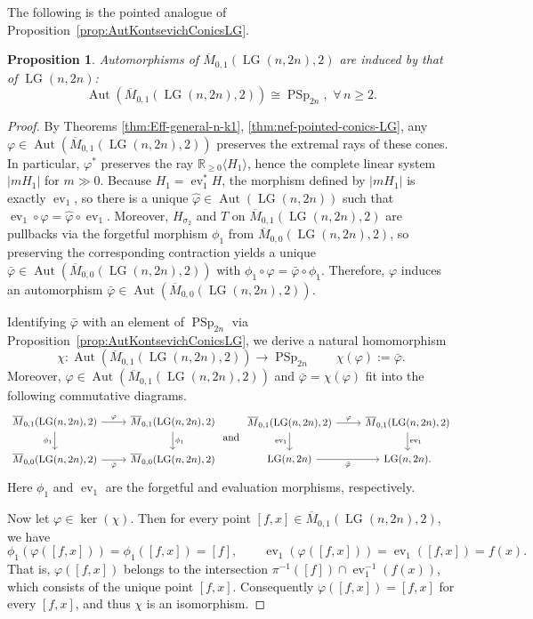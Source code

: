 \documentclass[10pt]{amsart}
\newtheorem{proposition}[theorem]{Proposition}
\theoremstyle{definition}
\newcommand{\Aut}{\operatorname{Aut}}
\newcommand{\LG}{\operatorname{LG}}
\DeclareMathOperator{\PSp}{PSp}
\newcommand{\ev}{\operatorname{ev}}
\theoremstyle{plain} %
\begin{document}
The following is the pointed analogue of Proposition~\ref{prop:AutKontsevichConicsLG}.

\begin{proposition}\label{prop:AutKontsevichConicsLGpointed}
Automorphisms of $\overline{M}_{0,1}(\LG(n,2n),2)$ are induced by that of $\LG(n,2n)$:
\[
\Aut(\overline{M}_{0,1}(\LG(n,2n),2))\cong\PSp_{2n},\,\,\forall\,n\geq 2.
\]
\end{proposition}

\begin{proof}
By Theorems \ref{thm:Eff-general-n-k1}, \ref{thm:nef-pointed-conics-LG}, any
$\varphi\in\Aut(\overline{M}_{0,1}(\LG(n,2n),2))$ preserves the extremal rays of these cones. In particular, $\varphi^{*}$ preserves the ray
$\mathbb{R}_{\ge 0}\langle H_1\rangle$, hence the complete linear system $|mH_1|$ for $m\gg 0$.
Because $H_1=\ev_1^{*}H$, the morphism defined by $|mH_1|$ is exactly $\ev_1$, so there is a unique
$\widehat\varphi\in \Aut(\LG(n,2n))$ such that $\ev_1\circ \varphi=\widehat\varphi\circ \ev_1$.
Moreover, $H_{\sigma_2}$ and $T$ on $\overline{M}_{0,1}(\LG(n,2n),2)$ are pullbacks via the forgetful morphism
$\phi_1$ from $\overline{M}_{0,0}(\LG(n,2n),2)$, so preserving the corresponding contraction yields a unique
$\bar\varphi\in \Aut(\overline{M}_{0,0}(\LG(n,2n),2))$ with $\phi_1\circ \varphi=\bar\varphi\circ \phi_1$.  Therefore, $\varphi$ induces an automorphism $\bar\varphi\in\Aut(\overline{M}_{0,0}(\LG(n,2n),2))$.


Identifying $\bar\varphi$ with an element of $\PSp_{2n}$ via Proposition~\ref{prop:AutKontsevichConicsLG}, we derive a natural homomorphism
\[
\chi\colon\Aut(\overline{M}_{0,1}(\LG(n,2n),2))\rightarrow \PSp_{2n}
\qquad
\chi(\varphi):=\bar\varphi.
\]
Moreover, 
$\varphi\in\Aut(\overline{M}_{0,1}(\LG(n,2n),2))$ and  $\bar\varphi=\chi(\varphi)$ fit into the following commutative diagrams.
\[
\begin{tikzcd}
\overline{M}_{0,1}(\LG(n,2n),2) \arrow[r,"\varphi"] \arrow[d,"\phi_1"'] &
\overline{M}_{0,1}(\LG(n,2n),2) \arrow[d,"\phi_1"] \\
\overline{M}_{0,0}(\LG(n,2n),2) \arrow[r,"\bar\varphi"'] &
\overline{M}_{0,0}(\LG(n,2n),2)
\end{tikzcd}
\,\, {\rm and}\,\,
\begin{tikzcd}
\overline{M}_{0,1}(\LG(n,2n),2) \arrow[r,"\varphi"] \arrow[d,"\ev_1"'] &
\overline{M}_{0,1}(\LG(n,2n),2) \arrow[d,"\ev_1"] \\
\LG(n,2n) \arrow[r,"\bar\varphi"'] &
\LG(n,2n).
\end{tikzcd}
\]
Here $\phi_1$ and $\ev_1$ are the forgetful and evaluation morphisms, respectively.


Now let $\varphi\in\ker(\chi)$. Then for every point $[f,x]\in \overline{M}_{0,1}(\LG(n,2n),2)$, we have
\[
\phi_1(\varphi([f,x]))=\phi_1([f,x])=[f],
\qquad
\ev_1(\varphi([f,x]))=\ev_1([f,x])=f(x).
\]
That is,  $\varphi([f,x])$ belongs to the intersection
\(
\pi^{-1}([f]) \cap \ev_1^{-1}(f(x))
\), which consists of the unique point $[f,x]$. Consequently $\varphi([f,x])=[f,x]$ for every $[f,x]$, and thus $\chi$ is an isomorphism.
\end{proof}
\end{document}
